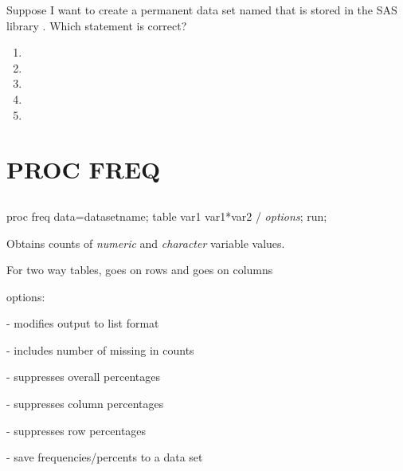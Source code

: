 \begin{frame}
\begin{clicker}{Suppose I want to create a permanent data set named  that is stored in the SAS library . Which  statement is correct?}
\begin{enumerate}
\item {}
\item {}
\item {}
\item {}
\item {}
\end{enumerate}
\end{clicker}
\end{frame}

\section[PROC FREQ]{PROC FREQ}
\subsection{}
\begin{frame}
\end{frame}

\begin{frame}[fragile]
\footnotesize
\begin{code}{.0}
proc freq data=datasetname;
    table var1 var1*var2 / \emph{options};
run;
\end{code}
\emp
\bi
\item Obtains counts of \emph{numeric} and \emph{character} variable values.
\item For two way tables,  goes on rows and  goes on columns
\item {} options:
	\bi
	\item {} - modifies output to list format
	\item {} - includes number of missing in counts
    \item {} - suppresses overall percentages
    \item {} - suppresses column percentages
    \item {} - suppresses row percentages
    \item {} - save frequencies/percents to a data set
	\ei
\ei
\end{frame}

